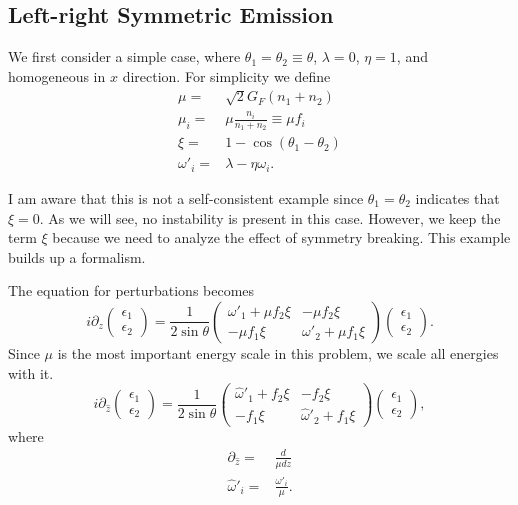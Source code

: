 \subsection{Left-right Symmetric Emission}


We first consider a simple case, where $\theta_1=\theta_2\equiv\theta$, $\lambda=0$, $\eta=1$, and homogeneous in $x$ direction. For simplicity we define
\begin{align*}
   \mu =& \sqrt{2}G_F (n_1 + n_2)\\
   \mu_i =& \mu \frac{n_i}{n_1+n_2}\equiv \mu f_i \\
   \xi = & 1-\cos(\theta_1-\theta_2)\\
   \omega'_i = & \lambda - \eta\omega_i.
\end{align*}

I am aware that this is not a self-consistent example since $\theta_1=\theta_2$ indicates that $\xi=0$. As we will see, no instability is present in this case. However, we keep the term $\xi$ because we need to analyze the effect of symmetry breaking. This example builds up a formalism.

The equation for perturbations becomes
\begin{equation}
   i\partial_z\begin{pmatrix}
   \epsilon_1 \\
   \epsilon_2
   \end{pmatrix} = \frac{1}{2\sin\theta} \begin{pmatrix}
   \omega'_1 + \mu f_2\xi & -\mu f_2 \xi \\
   -\mu f_1 \xi & \omega'_2 + \mu f_1 \xi
   \end{pmatrix}\begin{pmatrix}
   \epsilon_1 \\
   \epsilon_2
   \end{pmatrix}.
   \label{eqn-linearized-eom-symmetric-eg}
\end{equation}
Since $\mu$ is the most important energy scale in this problem, we scale all energies with it.
\begin{equation}
   i\partial_{\hat z}\begin{pmatrix}
   \epsilon_1 \\
   \epsilon_2
   \end{pmatrix} = \frac{1}{2\sin\theta} \begin{pmatrix}
   \hat\omega'_1 +  f_2\xi & - f_2 \xi \\
   - f_1 \xi & \hat\omega'_2 +  f_1 \xi
   \end{pmatrix}\begin{pmatrix}
   \epsilon_1 \\
   \epsilon_2
   \end{pmatrix},
\end{equation}
where
\begin{align*}
   \partial_{\hat z} =& \frac{d}{\mu dz} \\
   \hat \omega'_i =& \frac{\omega'_i}{\mu}.
\end{align*}


